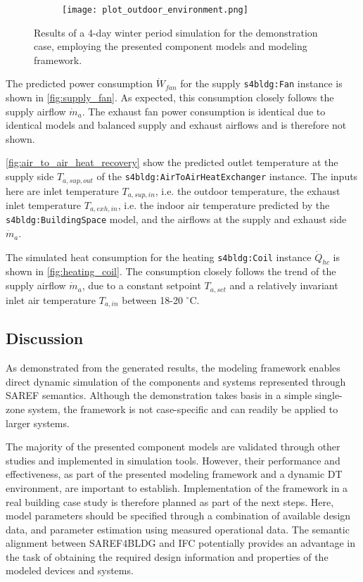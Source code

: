 \begin{figure*}
    \begin{subfigure}{0.45\linewidth}
        \centering
        \texttt{[image: plot\_outdoor\_environment.png]}
        \vspace*{\distanceToCaption mm}
        \caption{}
        \label{fig:outdoor_environment}
    \end{subfigure}
    \caption{Results of a 4-day winter period simulation for the demonstration case, employing the presented component models and modeling framework.}
    \label{fig:simulation}
\end{figure*}

The predicted power consumption $\dot{W}_{fan}$ for the supply \texttt{s4bldg:Fan} instance is shown in \autoref{fig:supply_fan}. As expected, this consumption closely follows the supply airflow $\dot{m}_a$. The exhaust fan power consumption is identical due to identical models and balanced supply and exhaust airflows and is therefore not shown. 

\autoref{fig:air_to_air_heat_recovery} show the predicted outlet temperature at the supply side $T_{a,sup,out}$ of the \texttt{s4bldg:AirToAirHeatExchanger} instance. The inputs here are inlet temperature $T_{a,sup,in}$, i.e. the outdoor temperature, the exhaust inlet temperature $T_{a,exh,in}$, i.e. the indoor air temperature predicted by the \texttt{s4bldg:BuildingSpace} model, and the airflows at the supply and exhaust side $\dot{m}_a$. 

The simulated heat consumption for the heating \texttt{s4bldg:Coil} instance $\dot{Q}_{hc}$ is shown in \autoref{fig:heating_coil}. The consumption closely follows the trend of the supply airflow $\dot{m}_a$, due to a constant setpoint $T_{a,set}$ and a relatively invariant inlet air temperature $T_{a,in}$ between 18-20 $^\circ$C. 



\subsection{Discussion}

As demonstrated from the generated results, the modeling framework enables direct dynamic simulation of the components and systems represented through SAREF semantics. Although the demonstration takes basis in a simple single-zone system, the framework is not case-specific and can readily be applied to larger systems.

The majority of the presented component models are validated through other studies and implemented in simulation tools. However, their performance and effectiveness, as part of the presented modeling framework and a dynamic DT environment, are important to establish. Implementation of the framework in a real building case study is therefore planned as part of the next steps. Here, model parameters should be specified through a combination of available design data, and parameter estimation using measured operational data. The semantic alignment between SAREF4BLDG and IFC potentially provides an advantage in the task of obtaining the required design information and properties of the modeled devices and systems. 


